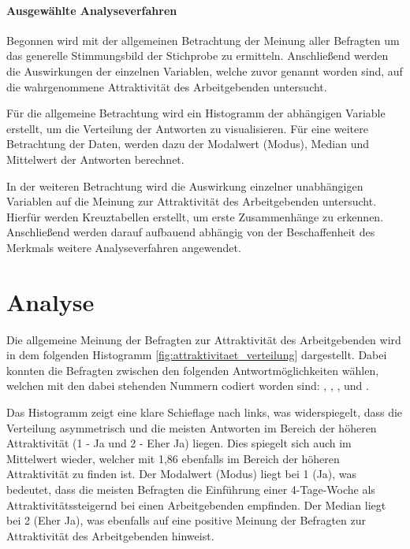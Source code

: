 \paragraph{Ausgewählte Analyseverfahren} Begonnen wird mit der allgemeinen Betrachtung der Meinung 
aller Befragten um das generelle Stimmungsbild der Stichprobe zu ermitteln. Anschließend werden die Auswirkungen
der einzelnen Variablen, welche zuvor genannt worden sind, auf die wahrgenommene Attraktivität des Arbeitgebenden 
untersucht.

Für die allgemeine Betrachtung wird ein Histogramm der abhängigen Variable erstellt, um die Verteilung 
der Antworten zu visualisieren. Für eine weitere Betrachtung der Daten, werden 
dazu der Modalwert (Modus), Median und Mittelwert der Antworten berechnet.

In der weiteren Betrachtung wird die Auswirkung einzelner unabhängigen Variablen auf die Meinung zur 
Attraktivität des Arbeitgebenden untersucht. Hierfür werden Kreuztabellen erstellt, um erste
Zusammenhänge zu erkennen. 
Anschließend werden darauf aufbauend abhängig von der Beschaffenheit des Merkmals
weitere Analyseverfahren angewendet. 

\section{Analyse}

Die allgemeine Meinung der Befragten zur Attraktivität des Arbeitgebenden wird in dem folgenden Histogramm 
\ref{fig:attraktivitaet_verteilung} dargestellt. Dabei konnten die Befragten zwischen den folgenden Antwortmöglichkeiten wählen,
welchen mit den dabei stehenden Nummern codiert worden sind: , ,
,  und . 


Das Histogramm zeigt eine klare Schieflage nach links, was widerspiegelt, dass die Verteilung 
asymmetrisch und die meisten Antworten im Bereich der höheren Attraktivität (1 - Ja und 2 - Eher Ja) liegen. 
Dies spiegelt sich auch im Mittelwert wieder, welcher mit 1,86 ebenfalls im Bereich der höheren Attraktivität
zu finden ist. Der Modalwert (Modus) liegt bei 1 (Ja), was bedeutet, dass die meisten Befragten die Einführung einer 
4-Tage-Woche als Attraktivitätssteigernd bei einen Arbeitgebenden empfinden. Der Median
liegt bei 2 (Eher Ja), was ebenfalls auf eine positive Meinung der Befragten zur Attraktivität des Arbeitgebenden
hinweist.


